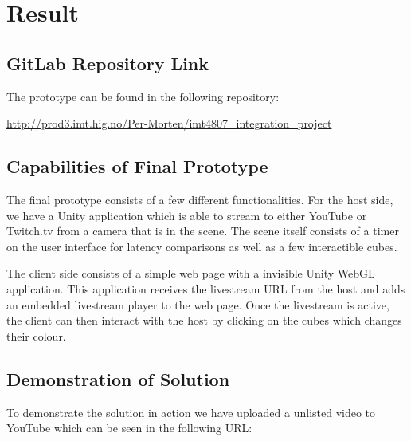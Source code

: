 \section{Result}

\subsection{GitLab Repository Link}
The prototype can be found in the following repository:

\url{http://prod3.imt.hig.no/Per-Morten/imt4807_integration_project}

\subsection{Capabilities of Final Prototype}
The final prototype consists of a few different functionalities. For the host side, we have a Unity application which is able to stream to either YouTube or Twitch.tv from a camera that is in the scene. The scene itself consists of a timer on the user interface for latency comparisons as well as a few interactible cubes. 

The client side consists of a simple web page with a invisible Unity WebGL application. This application receives the livestream URL from the host and adds an embedded livestream player to the web page. Once the livestream is active, the client can then interact with the host by clicking on the cubes which changes their colour. 

\subsection{Demonstration of Solution}
To demonstrate the solution in action we have uploaded a unlisted video to YouTube which can be seen in the following URL:

